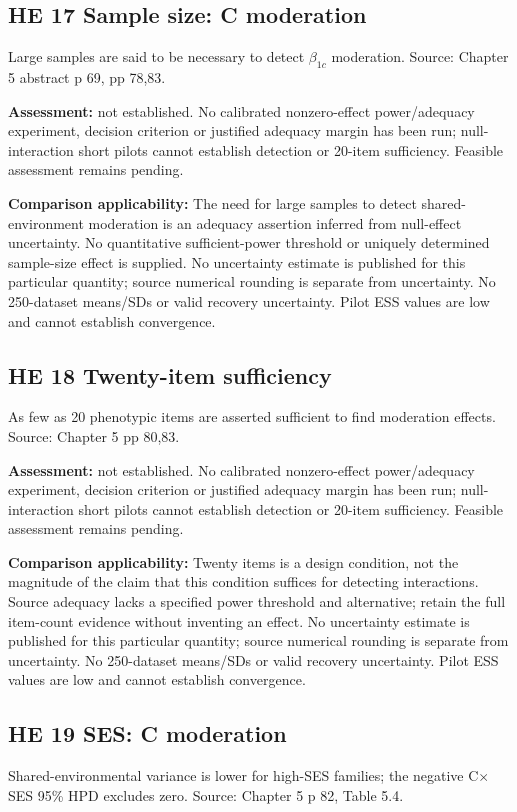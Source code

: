 \documentclass[11pt]{article}
\begin{document}
\subsection{HE 17 Sample size: C moderation}\label{head:HE17}
Large samples are said to be necessary to detect $\beta_{1c}$ moderation. Source: Chapter 5 abstract p 69, pp 78,83.

\textbf{Assessment:} not established. No calibrated nonzero-effect power/adequacy experiment, decision criterion or justified adequacy margin has been run; null-interaction short pilots cannot establish detection or 20-item sufficiency. Feasible assessment remains pending.

\textbf{Comparison applicability:} The need for large samples to detect shared-environment moderation is an adequacy assertion inferred from null-effect uncertainty. No quantitative sufficient-power threshold or uniquely determined sample-size effect is supplied. No uncertainty estimate is published for this particular quantity; source numerical rounding is separate from uncertainty. No 250-dataset means/SDs or valid recovery uncertainty. Pilot ESS values are low and cannot establish convergence.
\subsection{HE 18 Twenty-item sufficiency}\label{head:HE18}
As few as 20 phenotypic items are asserted sufficient to find moderation effects. Source: Chapter 5 pp 80,83.

\textbf{Assessment:} not established. No calibrated nonzero-effect power/adequacy experiment, decision criterion or justified adequacy margin has been run; null-interaction short pilots cannot establish detection or 20-item sufficiency. Feasible assessment remains pending.

\textbf{Comparison applicability:} Twenty items is a design condition, not the magnitude of the claim that this condition suffices for detecting interactions. Source adequacy lacks a specified power threshold and alternative; retain the full item-count evidence without inventing an effect. No uncertainty estimate is published for this particular quantity; source numerical rounding is separate from uncertainty. No 250-dataset means/SDs or valid recovery uncertainty. Pilot ESS values are low and cannot establish convergence.
\subsection{HE 19 SES: C moderation}\label{head:HE19}
Shared-environmental variance is lower for high-SES families; the negative C$\times$SES 95\% HPD excludes zero. Source: Chapter 5 p 82, Table 5.4.
\end{document}
